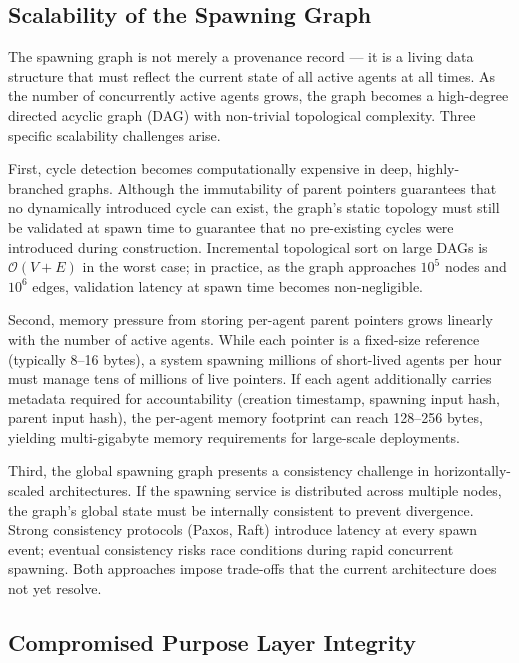 \subsection{Scalability of the Spawning Graph}

The spawning graph is not merely a provenance record — it is a living
data structure that must reflect the current state of all active agents
at all times. As the number of concurrently active agents grows, the
graph becomes a high-degree directed acyclic graph (DAG) with non-trivial
topological complexity. Three specific scalability challenges arise.

First, cycle detection becomes computationally expensive in deep,
highly-branched graphs. Although the immutability of parent pointers
guarantees that no dynamically introduced cycle can exist, the graph's
static topology must still be validated at spawn time to guarantee that
no pre-existing cycles were introduced during construction. Incremental
topological sort on large DAGs is $\mathcal{O}(V + E)$ in the worst case;
in practice, as the graph approaches $10^5$ nodes and $10^6$ edges,
validation latency at spawn time becomes non-negligible.

Second, memory pressure from storing per-agent parent pointers grows
linearly with the number of active agents. While each pointer is a
fixed-size reference (typically 8--16 bytes), a system spawning millions
of short-lived agents per hour must manage tens of millions of live
pointers. If each agent additionally carries metadata required for
accountability (creation timestamp, spawning input hash, parent input
hash), the per-agent memory footprint can reach 128--256 bytes, yielding
multi-gigabyte memory requirements for large-scale deployments.

Third, the global spawning graph presents a consistency challenge in
horizontally-scaled architectures. If the spawning service is
distributed across multiple nodes, the graph's global state must be
internally consistent to prevent divergence. Strong consistency
protocols (Paxos, Raft) introduce latency at every spawn event; eventual
consistency risks race conditions during rapid concurrent spawning.
Both approaches impose trade-offs that the current architecture does
not yet resolve.

\subsection{Compromised Purpose Layer Integrity}

